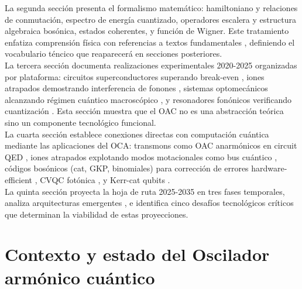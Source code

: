 \documentclass[11pt,a4paper,spanish]{book}
\begin{document}
\begin{itemize}
La segunda sección presenta el formalismo matemático: hamiltoniano y relaciones de conmutación, espectro de energía cuantizado, operadores escalera y estructura algebraica bosónica, estados coherentes, y función de Wigner. Este tratamiento enfatiza comprensión física con referencias a textos fundamentales \citep{griffiths2018, sakurai2020, cohentannoudji2019, gerry2004, nielsen2010}, definiendo el vocabulario téncico que reaparecerá en secciones posteriores.\\

La tercera sección documenta realizaciones experimentales 2020-2025 organizadas por plataforma: circuitos superconductores superando break-even \citep{sivak2023, ni2023, reglade2024, putterman2025}, iones atrapados demostrando interferencia de fonones \citep{hou2024, burd2024, park2024}, sistemas optomecánicos alcanzando régimen cuántico macroscópico \citep{dania2025, bild2023, piotrowski2023}, y resonadores fonónicos verificando cuantización \citep{arrangoiz2019, wollack2022, qiao2023}. Esta sección muestra que el OAC no es una abstracción teórica sino un componente tecnológico funcional.\\

La cuarta sección establece conexiones directas con computación cuántica mediante las aplicaciones del OCA: transmons como OAC anarmónicos en circuit QED \citep{koch2007, blais2021, krantz2019}, iones atrapados explotando modos motacionales como bus cuántico \citep{cirac1995, molmer1999, bruzewicz2019}, códigos bosónicos (cat, GKP, binomiales) para corrección de errores hardware-efficient \citep{gkp2001, ofek2016, michael2016, brady2024}, CVQC fotónica \citep{braunstein2005, madsen2022, bourassa2021}, y Kerr-cat qubits \citep{grimm2020, hajr2024}.\\ 

La quinta sección proyecta la hoja de ruta 2025-2035 en tres fases temporales, analiza arquitecturas emergentes \citep{liu2024, eickbusch2024, chamberland2022}, e identifica cinco desafíos tecnológicos críticos que determinan la viabilidad de estas proyecciones.


\end{itemize}




\chapter{Contexto y estado del Oscilador armónico cuántico}\label{contexto}
\end{document}
